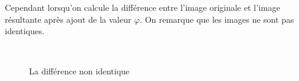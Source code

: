 \documentclass[a4paper,11pt]{article}
\begin{document}
Cependant lorsqu'on calcule la différence entre l'image originale et 
l'image résultante après ajout de la valeur $\varphi$. On remarque que 
les images ne sont pas identiques.

\begin{figure}[H]
  \begin{center}  
    \\
    \caption{La différence non identique}
  \end{center}
\end{figure}
\end{document}
